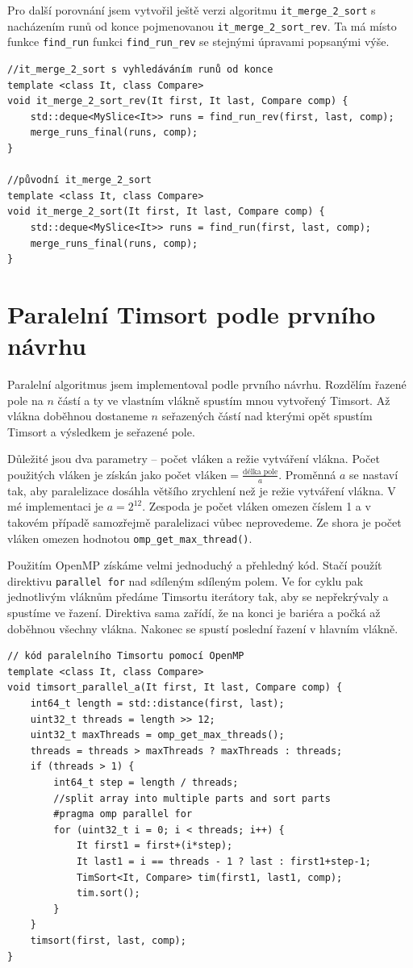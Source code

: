 \documentclass[thesis=B,czech]{FITthesis}[2019/12/23]
\begin{document}
Pro další porovnání jsem vytvořil ještě verzi algoritmu \texttt{it\_merge\_2\_sort} s nacházením runů od konce pojmenovanou \texttt{it\_merge\_2\_sort\_rev}. Ta má místo funkce \texttt{find\_run} funkci \texttt{find\_run\_rev} se stejnými úpravami popsanými výše.

\begin{verbatim}
//it_merge_2_sort s vyhledáváním runů od konce
template <class It, class Compare>
void it_merge_2_sort_rev(It first, It last, Compare comp) {
    std::deque<MySlice<It>> runs = find_run_rev(first, last, comp);
    merge_runs_final(runs, comp);
}

//původní it_merge_2_sort
template <class It, class Compare>
void it_merge_2_sort(It first, It last, Compare comp) {
    std::deque<MySlice<It>> runs = find_run(first, last, comp);
    merge_runs_final(runs, comp);
}
\end{verbatim}

\section{Paralelní Timsort podle prvního návrhu}
Paralelní algoritmus jsem implementoval podle prvního návrhu. Rozdělím řazené pole na $n $ částí a ty ve vlastním vlákně spustím mnou vytvořený Timsort. Až vlákna doběhnou dostaneme $ n $ seřazených částí nad kterými opět spustím Timsort a výsledkem je seřazené pole. 

Důležité jsou dva parametry -- počet vláken a režie vytváření vlákna. Počet použitých vláken je získán jako $ \textrm{počet vláken} = \frac{\textrm{délka pole}}{a} $. Proměnná $ a $ se nastaví tak, aby paralelizace dosáhla většího zrychlení než je režie vytváření vlákna. V mé implementaci je $ a = 2^{12} $. Zespoda je počet vláken omezen číslem 1 a v takovém případě samozřejmě paralelizaci vůbec neprovedeme. Ze shora je počet vláken omezen hodnotou
 \texttt{omp\_get\_max\_thread()}. 

Použitím OpenMP získáme velmi jednoduchý a přehledný kód. Stačí použít direktivu \texttt{parallel for} nad sdíleným sdíleným polem. Ve for cyklu pak jednotlivým vláknům předáme Timsortu iterátory tak, aby se nepřekrývaly a spustíme ve řazení. Direktiva sama zařídí, že na konci je bariéra a počká až doběhnou všechny vlákna. Nakonec se spustí poslední řazení v hlavním vlákně.

\begin{verbatim}
// kód paralelního Timsortu pomocí OpenMP
template <class It, class Compare>
void timsort_parallel_a(It first, It last, Compare comp) {
    int64_t length = std::distance(first, last);
    uint32_t threads = length >> 12;
    uint32_t maxThreads = omp_get_max_threads();
    threads = threads > maxThreads ? maxThreads : threads;
    if (threads > 1) {
        int64_t step = length / threads;
        //split array into multiple parts and sort parts
        #pragma omp parallel for
        for (uint32_t i = 0; i < threads; i++) {
            It first1 = first+(i*step);
            It last1 = i == threads - 1 ? last : first1+step-1;
            TimSort<It, Compare> tim(first1, last1, comp);
            tim.sort();
        }
    }
    timsort(first, last, comp);
}
\end{verbatim}
\end{document}
